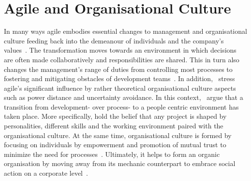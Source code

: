 \section{Agile and Organisational Culture}

In many ways agile embodies essential changes to management and organisational culture feeding back into the demeanour of individuals and the company's values~\citep{nerur2005migratingagile}.
The transformation moves towards an environment in which decisions are often made collaboratively and responsibilities are shared. This in turn also changes the management's range of duties from controlling most processes to fostering and mitigating obstacles of development teams~\citep{leffingwell2007scalelargecorps}. In addition,~\citet{2013schweigertamm} stress agile's significant influence by rather theoretical organisational culture aspects such as power distance and uncertainty avoidance.
In this context,~\citet{nerur2005migratingagile} argue that a transition from development- over process- to a people centric environment has taken place. More specifically, \citet{cockburn2001agilepeoplefactor} hold the belief that any project is shaped by personalities, different skills and the working environment paired with the organisational culture. At the same time, organisational culture is formed by focusing on individuals by empowerment and promotion of mutual trust to minimize the need for processes~\citep{cockburn2001agilepeoplefactor}. Ultimately, it helps to form an organic organisation by moving away from its mechanic counterpart to embrace social action on a corporate level~\citep{nerur2005migratingagile}.

